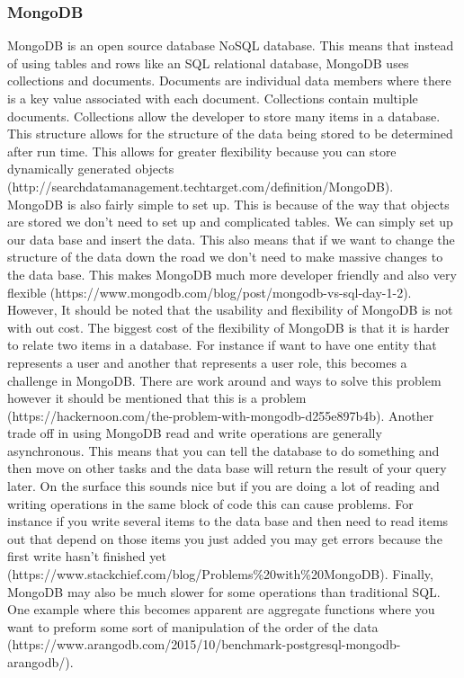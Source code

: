 \documentclass[letterpaper,10pt]{article}
\begin{document}
		\subsubsection{MongoDB}
		MongoDB is an open source database NoSQL database. This means that instead of using tables and rows like an SQL relational database, MongoDB uses collections and documents. Documents are individual data members where there is a key value associated with each document. Collections contain multiple documents. Collections allow the developer to store many items in a database. This structure allows for the structure of the data being stored to be determined after run time. This allows for greater flexibility because you can store dynamically generated objects (http://searchdatamanagement.techtarget.com/definition/MongoDB).\\
		MongoDB is also fairly simple to set up. This is because of the way that objects are stored we don't need to set up and complicated tables. We can simply set up our data base and insert the data. This also means that if we want to change the structure of the data down the road we don't need to make massive changes to the data base. This makes MongoDB much more developer friendly and also very flexible (https://www.mongodb.com/blog/post/mongodb-vs-sql-day-1-2).\\
		However, It should be noted that the usability and flexibility of MongoDB is not with out cost. The biggest cost of the flexibility of MongoDB is that it is harder to relate two items in a database. For instance if want to have one entity that represents a user and another that represents a user role, this becomes a challenge in MongoDB. There are work around and ways to solve this problem however it should be mentioned that this is a problem (https://hackernoon.com/the-problem-with-mongodb-d255e897b4b). Another trade off in using MongoDB read and write operations are generally asynchronous. This means that you can tell the database to do something and then move on other tasks and the data base will return the result of your query later. On the surface this sounds nice but if you are doing a lot of reading and writing operations in the same block of code this can cause problems. For instance if you write several items to the data base and then need to read items out that depend on those items you just added you may get errors because the first write hasn't finished yet (https://www.stackchief.com/blog/Problems\%20with\%20MongoDB). Finally, MongoDB may also be much slower for some operations than traditional SQL. One example where this becomes apparent are aggregate functions where you want to preform some sort of manipulation of the order of the data (https://www.arangodb.com/2015/10/benchmark-postgresql-mongodb-arangodb/).\\
	
\end{document}
